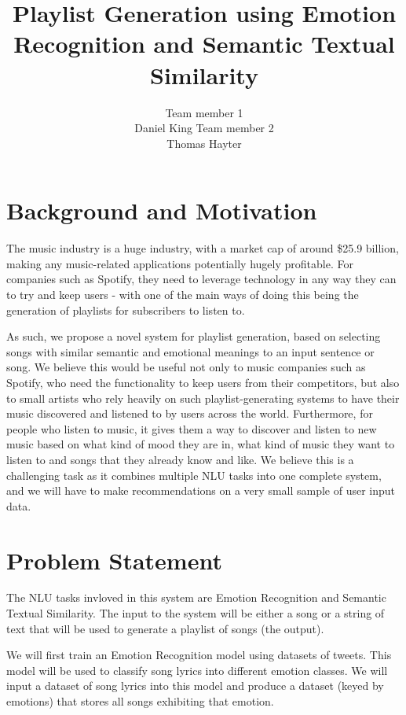 \documentclass[11pt]{article}
\title{Playlist Generation using Emotion Recognition and Semantic Textual Similarity}
\author{
    Team member 1 \\
    Daniel King
    \And
    Team member 2 \\
    Thomas Hayter
}
\begin{document}
\maketitle


\section{Background and Motivation}

The music industry is a huge industry, with a market cap of around \$25.9 billion\cite{mccain_2023}, making any music-related applications potentially hugely profitable. For companies such as Spotify, they need to leverage technology in any way they can to try and keep users - with one of the main ways of doing this being the generation of playlists for subscribers to listen to.

As such, we propose a novel system for playlist generation, based on selecting songs with similar semantic and emotional meanings to an input sentence or song. We believe this would be useful not only to music companies such as Spotify, who need the functionality to keep users from their competitors, but also to small artists who rely heavily on such playlist-generating systems to have their music discovered and listened to by users across the world. Furthermore, for people who listen to music, it gives them a way to discover and listen to new music based on what kind of mood they are in, what kind of music they want to listen to and songs that they already know and like. We believe this is a challenging task as it combines multiple NLU tasks into one complete system, and we will have to make recommendations on a very small sample of user input data.

\section{Problem Statement}

The NLU tasks invloved in this system are Emotion Recognition and Semantic Textual Similarity. The input to the system will be either a song or a string of text that will be used to generate a playlist of songs (the output).

We will first train an Emotion Recognition model using datasets of tweets\cite{gupta_2021}\cite{pandey_2022}. This model will be used to classify song lyrics into different emotion classes. We will input a dataset of song lyrics\cite{shah_2021} into this model and produce a dataset (keyed by emotions) that stores all songs exhibiting that emotion.
\end{document}
